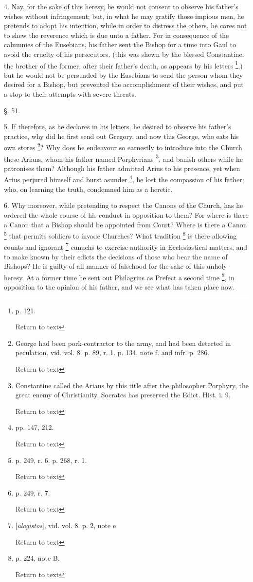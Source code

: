 4. Nay, for the sake of this heresy, he would not
consent to observe his father's wishes without infringement; but, in
what he may gratify those impious men, he pretends to adopt his
intention, while in order to distress the others, he cares not to shew
the reverence which is due unto a father. For in consequence of the
calumnies of the Eusebians, his father sent the Bishop for a time into
Gaul to avoid the cruelty of his persecutors, (this was shewn by the
blessed Constantine, the brother of the former, after their father's
death, as appears by his letters \footnote{p. 121.

Return to text},) but he would not be
persuaded by the Eusebians to send the person whom they desired for a
Bishop, but prevented the accomplishment of their wishes, and put a
stop to their attempts with severe threats.

§. 51.

5. If therefore, as he declares in his letters,
he desired to observe his father's practice, why did he first send
out Gregory, and now this George, who eats his own stores \footnote{George had been pork-contractor to the army,
and had been detected in peculation. vid. vol. 8. p. 89, r. 1. p. 134,
note f. and infr. p. 286.

Return to text}?
Why does he endeavour so earnestly to introduce into the Church these
Arians, whom his father named Porphyrians \footnote{Constantine called the Arians by this title
after the philosopher Porphyry, the great enemy of Christianity.
Socrates has preserved the Edict. Hist. i. 9.

Return to text}, and banish others
while he patronises them? Although his father admitted Arius to
his presence, yet when Arius perjured himself and burst asunder \footnote{pp. 147, 212.

Return to text}, he lost the compassion of his father; who, on learning the truth,
condemned him as a heretic.

6. Why moreover, while pretending to respect the
Canons of the Church, has he ordered the whole course of his conduct
in opposition to them? For where is there a Canon that a Bishop should
be appointed from Court? Where is there a Canon \footnote{p. 249, r. 6. p. 268, r. 1.

Return to text} that permits
soldiers to invade Churches? What tradition \footnote{p. 249, r. 7.

Return to text} is there
allowing counts and ignorant \footnote{[\emph{alogistos}], vid. vol. 8. p. 2, note e

Return to text} eunuchs to exercise authority
in Ecclesiastical matters, and to make known by their edicts the
decisions of those who bear the name of Bishops? He is guilty of all
manner of falsehood for the sake of this unholy heresy. At a former
time he sent out Philagrius as Prefect a second time \footnote{p. 224, note B.

Return to text}, in
opposition to the opinion of his father, and we see what has taken
place now.

